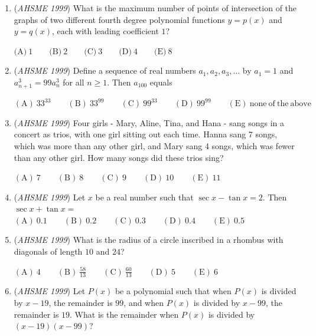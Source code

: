 \begin{enumerate}
 $\mathrm{(A) \ }2001 \qquad \mathrm{(B) \ }2010 \qquad \mathrm{(C) \ }2100 \qquad \mathrm{(D) \ }2726 \qquad \mathrm{(E) \ }6897$


	\item (\textit{AHSME 1999}) What is the maximum number of points of intersection of the graphs of two different fourth degree polynomial functions $y = p(x)$ and $y = q(x)$, each with leading coefficient $1$?


 $\textrm{(A)} \ 1 \qquad \textrm{(B)} \ 2 \qquad \textrm{(C)} \ 3 \qquad \textrm{(D)} \ 4 \qquad \textrm{(E)} \ 8$


	\item (\textit{AHSME 1999}) Define a sequence of real numbers $a_1, a_2, a_3, \ldots$ by $a_1 = 1$ and $a_{n+1}^3 = 99a_n^3$ for all $n \ge 1$. Then $a_{100}$ equals


 $\mathrm{(A) \ } 33^{33} \qquad \mathrm{(B) \ } 33^{99} \qquad \mathrm{(C) \ } 99^{33} \qquad \mathrm{(D) \ }99^{99} \qquad \mathrm{(E) \ none\ of\ the\ above}$


	\item (\textit{AHSME 1999}) Four girls - Mary, Aline, Tina, and Hana - sang songs in a concert as trios, with one girl sitting out each time. Hanna sang 7 songs, which was more than any other girl, and Mary sang 4 songs, which was fewer than any other girl. How many songs did these trios sing? 


 $\mathrm{(A) \ 7 } \qquad \mathrm{(B) \ 8 } \qquad \mathrm{(C) \ 9 } \qquad \mathrm{(D) \ 10 } \qquad \mathrm{(E) \ 11 }$


	\item (\textit{AHSME 1999}) Let $x$ be a real number such that $\sec x - \tan x = 2$. Then $\sec x + \tan x =$
$\mathrm{(A) \ } 0.1 \qquad \mathrm{(B) \ } 0.2 \qquad \mathrm{(C) \ } 0.3 \qquad \mathrm{(D) \ } 0.4 \qquad \mathrm{(E) \ } 0.5$


	\item (\textit{AHSME 1999}) What is the radius of a circle inscribed in a rhombus with diagonals of length $10$ and $24$?


 $\mathrm{(A) \ }4 \qquad \mathrm{(B) \ }\frac {58}{13} \qquad \mathrm{(C) \ }\frac{60}{13} \qquad \mathrm{(D) \ }5 \qquad \mathrm{(E) \ }6$


	\item (\textit{AHSME 1999}) Let $P(x)$ be a polynomial such that when $P(x)$ is divided by $x-19$, the remainder is $99$, and when $P(x)$ is divided by $x - 99$, the remainder is $19$. What is the remainder when $P(x)$ is divided by $(x-19)(x-99)$?



\end{enumerate}
